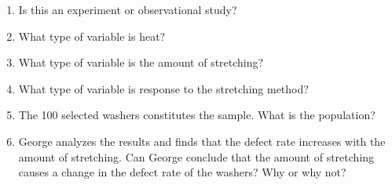\documentclass[11pt]{article}\usepackage[]{graphicx}\usepackage[]{color}
\newcommand{\ben}{\begin{enumerate}}
\newcommand{\een}{\end{enumerate}}
\begin{document}
\begin{itemize}
\ben 
\item Is this an experiment or observational study? 

\item What type of variable is heat? 
 
\item What type of variable is the amount of stretching? 
 
\item What type of variable is response to the stretching method?
 
\item
The 100 selected washers constitutes the sample. What is the population? 

\item George analyzes the results and finds that the defect rate
increases with the amount of stretching.
Can George conclude that the amount of stretching 
causes a change in the defect rate of the washers?
Why or why not?

\een


\end{itemize}
\end{document}
